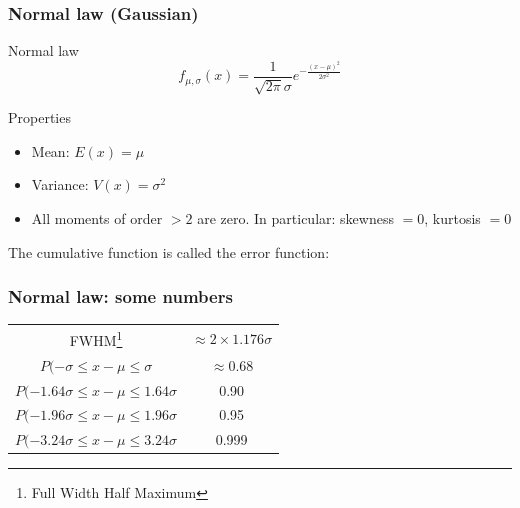 \documentclass[9pt]{beamer}
\begin{document}
\begin{frame}
 \frametitle{Normal law (Gaussian)}
 
 \begin{block}{Normal law}
  $$f_{\mu,\sigma} (x) = \frac{1}{\sqrt{2\pi} \sigma} e^{-\frac{(x-\mu)^2}{2\sigma^2}}$$
 \end{block}
 
 \begin{block}{Properties}
  \begin{itemize}
   \item Mean: $E(x) = \mu$
   \item Variance: $V(x) = \sigma^2$
   \item All moments of order $>2$ are zero. In particular: skewness $=0$, kurtosis $=0$
  \end{itemize}
 \end{block}

 The cumulative function is called the error function: 

\end{frame}

\begin{frame}
 \frametitle{Normal law: some numbers}
 
 \begin{center}
  \begin{tabular}{c|c}
   FWHM\footnote{Full Width Half Maximum} & $\approx 2 \times 1.176 \sigma$ \\
   $P(-\sigma \leq x-\mu \leq \sigma$ & $\approx 0.68$ \\
   $P(-1.64 \sigma \leq x-\mu \leq 1.64 \sigma$ & 0.90 \\
   $P(-1.96 \sigma \leq x-\mu \leq 1.96 \sigma$ & 0.95 \\
   $P(-3.24 \sigma \leq x-\mu \leq 3.24 \sigma$ & 0.999 
  \end{tabular}

 \end{center}

\end{frame}
\end{document}
